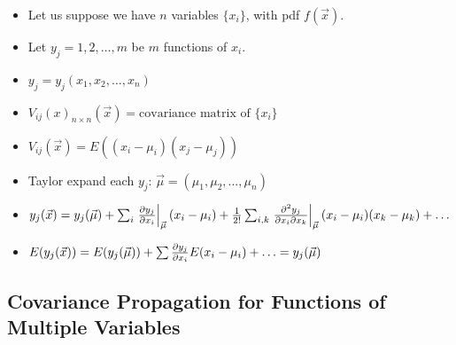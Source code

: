 \begin{itemize}
      \item Let us suppose we have $n$ variables $\{ x_i \}$, with pdf $f(\vec{x})$.
      \item Let $y_j = 1, 2, \ldots, m$ be $m$ functions of $x_i$.
      \item $y_j = y_j(x_1, x_2, \ldots, x_n)$
      \item $V_{ij}(x)_{n \times n}(\vec{x}) = \text{covariance matrix of } \{x_i\}$
      \item $V_{ij}(\vec{x}) = E((x_i - \mu_i)(x_j - \mu_j))$
      \item Taylor expand each $y_j$: $\vec{\mu} = (\mu_1, \mu_2, \ldots, \mu_n)$
      \item $y_j(\vec{x}) = y_j(\vec{\mu}) + \sum_i \left. \pdv{y_j}{x_i} \right|_{\vec{\mu}} (x_i - \mu_i) + \frac{1}{2!} \sum_{i,k} \left. \pdv[2]{y_j}{x_i}{x_k} \right|_{\vec{\mu}} (x_i - \mu_i)(x_k - \mu_k) + \ldots$
      \item $E(y_j(\vec{x})) = E(y_{j}(\vec{\mu})) + \sum \pdv{y_j}{x_i} E(x_i - \mu_i) + \ldots = y_j(\vec{\mu})$
\end{itemize}

\subsection{Covariance Propagation for Functions of Multiple Variables}

